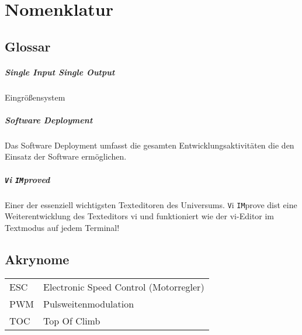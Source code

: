 %
\chapter*{Nomenklatur}
%
\section*{Glossar}
\paragraph{Single Input Single Output}
Eingrößensystem
\paragraph{Software Deployment}
Das Software Deployment umfasst die gesamten
Entwicklungsaktivitäten die den Einsatz der Software ermöglichen.
\paragraph{\texttt{V}i \texttt{IM}proved}
Einer der essenziell wichtigsten Texteditoren des Universums.
\texttt{V}i \texttt{IM}prove dist eine Weiterentwicklung des Texteditors
vi und funktioniert wie der vi-Editor im Textmodus auf jedem Terminal!
%
\section*{Akrynome}
\begin{longtable}{lp{13cm}}
	ESC & Electronic Speed Control (Motorregler)\\
	PWM & Pulsweitenmodulation\\
	TOC & Top Of Climb
\end{longtable}
%
